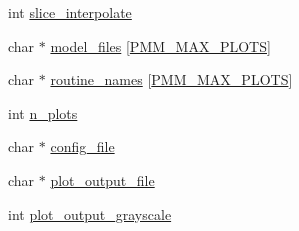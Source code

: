 \begin{DoxyCompactItemize}
\item 
int \hyperlink{structpmm__view__options_af498f394b649d03ad9921b0b60d52f5f}{slice\-\_\-interpolate}
\item 
char $\ast$ \hyperlink{structpmm__view__options_a5669dcc17daae82740b1a597498b3716}{model\-\_\-files} \mbox{[}\hyperlink{pmm__argparser_8h_abd48a493cd76b0db52214f985b198933}{P\-M\-M\-\_\-\-M\-A\-X\-\_\-\-P\-L\-O\-T\-S}\mbox{]}
\item 
char $\ast$ \hyperlink{structpmm__view__options_ad050b8ecaf9f39b1d392bf59e4630753}{routine\-\_\-names} \mbox{[}\hyperlink{pmm__argparser_8h_abd48a493cd76b0db52214f985b198933}{P\-M\-M\-\_\-\-M\-A\-X\-\_\-\-P\-L\-O\-T\-S}\mbox{]}
\item 
int \hyperlink{structpmm__view__options_a8693178c7bfd123bddfc04cdc54a1b8e}{n\-\_\-plots}
\item 
char $\ast$ \hyperlink{structpmm__view__options_afc11a8cbc3b2d8bb72776dcd194f74a4}{config\-\_\-file}
\item 
char $\ast$ \hyperlink{structpmm__view__options_a7dffb42b7ff126afbc84ecd67164f1da}{plot\-\_\-output\-\_\-file}
\item 
int \hyperlink{structpmm__view__options_af0b551d28018cbac1e2cd54799276f2f}{plot\-\_\-output\-\_\-grayscale}
\end{DoxyCompactItemize}


